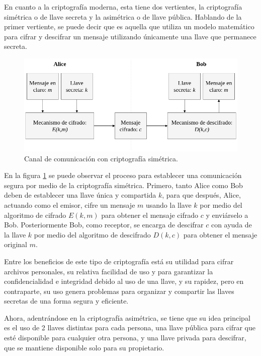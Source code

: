   En cuanto a la criptografía moderna, esta tiene dos vertientes, la
  criptografía simétrica o de llave secreta y la asimétrica o de llave
  pública. Hablando de la primer vertiente, se puede decir que es aquella
  que utiliza un modelo matemático para cifrar y descifrar un mensaje
  utilizando únicamente una llave que permanece secreta.

  \begin{figure}[H]
    \begin{center}
      \includegraphics[width=0.8\linewidth]
        {contenidos/antecedentes/intro/img/cripto_simetrica.png}
      \caption{Canal de comunicación con criptografía simétrica.}
      \label{cripto_simetrica}
    \end{center}
  \end{figure}

  En la figura \ref{cripto_simetrica} se puede observar el proceso para 
  establecer una comunicación segura por medio de la criptografía simétrica. 
  Primero, tanto Alice como Bob deben de establecer una llave única y 
  compartida $k$, para que después, Alice, actuando como el emisor, cifre un 
  mensaje $m$ usando la llave $k$ por medio del algoritmo de cifrado $E(k,m)$ 
  para obtener el mensaje cifrado $c$ y enviárselo a Bob. Posteriormente Bob, 
  como receptor, se encarga de descifrar $c$ con ayuda de la llave $k$ por 
  medio del algoritmo de descifrado $D(k,c)$ para obtener el mensaje original 
  $m$.

  Entre los beneficios de este tipo de criptografía está su utilidad para
  cifrar archivos personales, su relativa facilidad de uso y para garantizar
  la confidencialidad e integridad debido al uso de una llave, y su rapidez,
  pero en contraparte, su uso genera problemas para organizar y compartir
  las llaves secretas de una forma segura y eficiente.

  Ahora, adentrándose en la criptografía asimétrica, se tiene que su idea
  principal es el uso de 2 llaves distintas para cada persona, una llave
  pública para cifrar que esté disponible para cualquier otra persona, y una
  llave privada para descifrar, que se mantiene disponible solo para su
  propietario.


